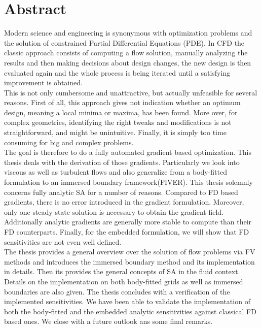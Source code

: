 \section*{Abstract}
Modern science and engineering is synonymous with optimization problems and the solution of constrained Partial Differential Equations (PDE).
In \acf{CFD} the classic approach consists of computing a flow solution, manually analyzing the results and then making decisions about design changes, the new design is then evaluated again and the whole process is being iterated until a satisfying improvement is obtained.\\
This is not only cumbersome and unattractive, but actually unfeasible for several reasons. First of all, this approach gives not indication whether an optimum design, meaning a local minima or maxima, has been found. More over, for complex geometries, identifying the right tweaks and modifications is not straightforward, and might be unintuitive. Finally, it is simply too time consuming for big and complex problems.\\
The goal is therefore to do a fully automated gradient based optimization. This thesis deals with the derivation of those gradients. Particularly we look into viscous as well as turbulent flows and also generalize from a body-fitted formulation to an immersed boundary framework(FIVER). This thesis solemnly concerns fully analytic \acf{SA} for a number of reasons. Compared to \acf{FD} based gradients, there is no error introduced in the gradient formulation. Moreover, only one steady state solution is necessary to obtain the gradient field. Additionally analytic gradients are generally more stable to compute than their \acf{FD} counterparts. Finally, for the embedded formulation, we will show that \ac{FD} sensitivities are not even well defined.\\
The thesis provides a general overview over the solution of flow problems via \ac{FV} methods and introduces the immersed boundary method and its implementation in details. Then its provides the general concepts of \ac{SA} in the fluid context. Details on the implementation on both body-fitted grids as well as immersed boundaries are also given.  The thesis concludes with a verification of the implemented sensitivities. We have been able to validate the implementation of both the body-fitted and the embedded analytic sensitivities against classical \ac{FD} based ones. We close with a future outlook ans some final remarks.


\newline
\newpage

